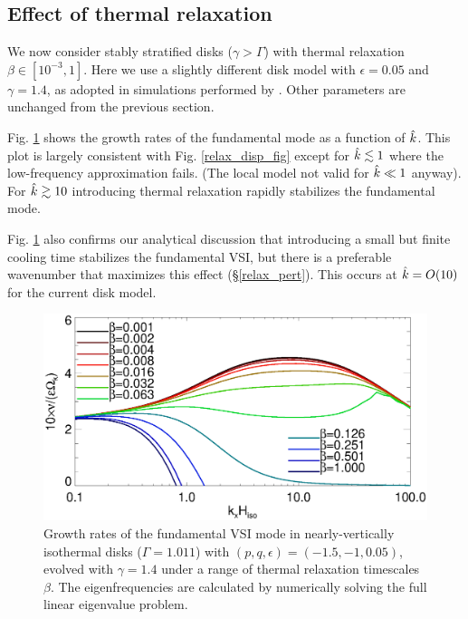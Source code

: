 \subsection{Effect of thermal relaxation}
We now consider stably stratified disks ($\gamma > \Gamma$) with
thermal relaxation $\beta\in[10^{-3},1]$. Here we use a slightly 
different disk model with $\epsilon=0.05$ and $\gamma=1.4$, as
adopted in simulations performed by \cite{nelson13}. Other parameters
are unchanged from the previous section.  

Fig. \ref{relax_growth_num} shows the growth rates of the fundamental  
mode as a function of $\hat{k}$. This plot is largely consistent with  
Fig. \ref{relax_disp_fig} except for $\hat{k}\lesssim 1$
where the low-frequency approximation fails. (The local model not valid
for $\hat{k}\ll1$ anyway). For $\hat{k}\gtrsim 10$ introducing thermal
relaxation rapidly stabilizes the fundamental mode. 


Fig. \ref{relax_growth_num} also confirms our analytical discussion that
introducing a small but finite cooling time stabilizes the fundamental
VSI, but there is a preferable wavenumber that maximizes this effect (\S\ref{relax_pert}).
This occurs at $\hat{k}= O(10)$ for the current disk model. 

\begin{figure}
   \includegraphics[width=\linewidth,clip=true,trim=0cm 0.0cm 0cm
   0cm]{figures/compare_eigen_imag_bloop} 
  \caption{Growth rates of the fundamental VSI mode in 
    nearly-vertically isothermal disks ($\Gamma=1.011$) with
    $(p,q,\epsilon)=(-1.5,-1,0.05)$, evolved with $\gamma=1.4$ under a
    range of thermal relaxation timescales   
    $\beta$. The eigenfrequencies are calculated by numerically 
    solving the full linear eigenvalue problem. \label{relax_growth_num}}   
\end{figure}   

